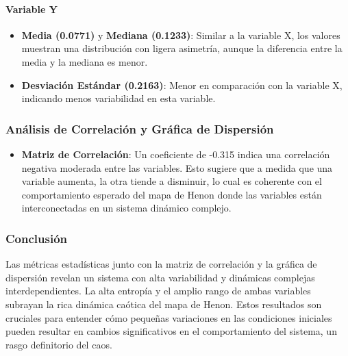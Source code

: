 \documentclass[11pt]{article}
\providecommand{\tightlist}{%
      \setlength{\itemsep}{0pt}\setlength{\parskip}{0pt}}
\begin{document}
\hypertarget{variable-y}{%
\paragraph{Variable Y}\label{variable-y}}

\begin{itemize}
\item
  \textbf{Media (0.0771)} y \textbf{Mediana (0.1233)}: Similar a la
  variable X, los valores muestran una distribución con ligera
  asimetría, aunque la diferencia entre la media y la mediana es menor.
\item
  \textbf{Desviación Estándar (0.2163)}: Menor en comparación con la
  variable X, indicando menos variabilidad en esta variable.
\end{itemize}

\hypertarget{anuxe1lisis-de-correlaciuxf3n-y-gruxe1fica-de-dispersiuxf3n}{%
\subsubsection{Análisis de Correlación y Gráfica de
Dispersión}\label{anuxe1lisis-de-correlaciuxf3n-y-gruxe1fica-de-dispersiuxf3n}}

\begin{itemize}
\tightlist
\item
  \textbf{Matriz de Correlación}: Un coeficiente de -0.315 indica una
  correlación negativa moderada entre las variables. Esto sugiere que a
  medida que una variable aumenta, la otra tiende a disminuir, lo cual
  es coherente con el comportamiento esperado del mapa de Henon donde
  las variables están interconectadas en un sistema dinámico complejo.
\end{itemize}

\hypertarget{conclusiuxf3n}{%
\subsubsection{Conclusión}\label{conclusiuxf3n}}

Las métricas estadísticas junto con la matriz de correlación y la
gráfica de dispersión revelan un sistema con alta variabilidad y
dinámicas complejas interdependientes. La alta entropía y el amplio
rango de ambas variables subrayan la rica dinámica caótica del mapa de
Henon. Estos resultados son cruciales para entender cómo pequeñas
variaciones en las condiciones iniciales pueden resultar en cambios
significativos en el comportamiento del sistema, un rasgo definitorio
del caos.
\end{document}
